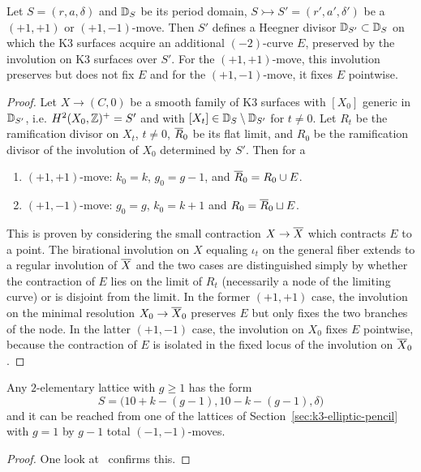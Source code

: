 \documentclass{amsart}
\begin{document}
\begin{lemma}\label{heegner-move-interp}
  Let $S=(r,a,\delta)$ and ${\mathbb D}_S$ be its period domain,
  $S\rightarrowtail S'=(r',a',\delta')$ be a $(+1,+1)$ or
  $(+1,-1)$-move.  Then $S'$ defines a Heegner divisor
  ${\mathbb D}_{S'}\subset {\mathbb D}_S$ on which the K3 surfaces acquire an
  additional $(-2)$-curve $E$, preserved by the involution on K3 surfaces over
  $S'$. For the $(+1,+1)$-move, this involution preserves
  but does not fix $E$ and for the $(+1,-1)$-move, it fixes $E$ pointwise.
\end{lemma}
\begin{proof}
  Let $X\to (C,0)$ be a smooth family of K3 surfaces with $[X_0]$
  generic in ${\mathbb D}_{S'}$, i.e. $H^2(X_0,{\mathbb Z})^+ = S'$ and with
  $[X_t]\in {\mathbb D}_S\setminus{\mathbb D}_{S'}$ for $t\ne0$.
  Let $R_t$ be the ramification divisor on $X_t$, $t\ne0$, ${\overline R}_0$ be
  its flat limit, and $R_0$ be the ramification divisor of the
  involution of $X_0$ determined by $S'$. Then for a 
    \begin{enumerate}
  \item[] $(+1,+1)$-move: $k_0=k$, $g_0=g-1$, and ${\overline R}_0 = R_0 \cup E$. 
  \item[] $(+1,-1)$-move: $g_0=g$, $k_0=k+1$ and $R_0 = {\overline R}_0 \sqcup
    E$. 
  \end{enumerate}
  
  This is proven by considering the small contraction $X\to {\overline X}$ which contracts
   $E$ to a point. The birational involution on $X$ equaling $\iota_t$
   on the general fiber extends to a regular involution of ${\overline X}$ and the
   two cases are distinguished simply by whether the contraction of $E$
   lies on the limit of $R_t$ (necessarily a node of the limiting curve)
   or is disjoint from the limit. In the former $(+1,+1)$ case, the involution on the minimal resolution
   $X_0\to {\overline X}_0$
   preserves $E$ but only fixes the two branches of the node. In the latter $(+1,-1)$ 
   case, the involution on $X_0$ fixes $E$ pointwise,
   because the contraction of $E$ is isolated in the fixed locus of the involution
   on ${\overline X}_0$.
\end{proof}


\begin{lemma}
 Any $2$-elementary lattice with $g\ge1$ has the form
 $$S = \big(10+k-(g-1), 10-k-(g-1), \delta\big)$$ and it can be reached from
 one of the lattices of Section~\ref{sec:k3-elliptic-pencil} with
 $g=1$ by $g-1$ total $(-1,-1)$-moves.
\end{lemma}
\begin{proof}
 One look at \fign\ confirms this.
\end{proof}
\end{document}
